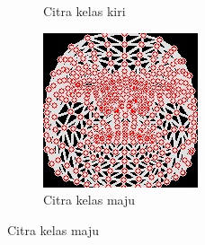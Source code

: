 \begin{figure}[H]
\begin{subfigure}{0.3\textwidth}
      \caption{Citra kelas kiri}
      \label{fig:image2}
  \end{subfigure}
  \hfill
  \begin{subfigure}{0.3\textwidth}
      \centering
      \includegraphics[width=\linewidth]{gambar/normal maju.jpg}
      \caption{Citra kelas maju}
      \label{fig:image3}
  \end{subfigure}
  

\end{figure}
